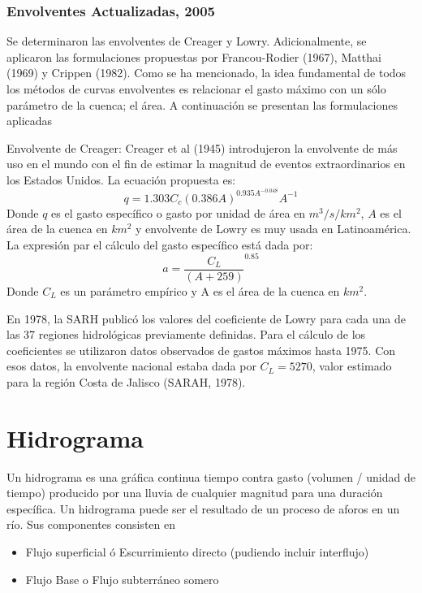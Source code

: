 \subsubsection{Envolventes Actualizadas, 2005}
Se determinaron las envolventes de Creager y Lowry. Adicionalmente, se aplicaron las formulaciones propuestas por Francou-Rodier (1967), Matthai (1969) y Crippen (1982).
Como se ha mencionado, la idea fundamental de todos los métodos de curvas envolventes es relacionar el gasto máximo con un sólo parámetro de la cuenca; el área. A continuación se presentan las formulaciones aplicadas

Envolvente de Creager: Creager et al (1945) introdujeron la envolvente de más uso en el mundo con el fin de estimar la magnitud de eventos extraordinarios en los Estados Unidos. La ecuación propuesta es:
\begin{equation}
    q = 1.303C_c\left(0.386A\right)^{0.935A^{ -0.048}}A^{ -1}
\end{equation}
Donde $q$ es el gasto específico o gasto por unidad de área en $m^{3}/s/km^2$, $A$ es el área de la cuenca en $km^2$ y envolvente de Lowry es muy usada en Latinoamérica. La expresión par el cálculo del gasto específico está dada por:
\begin{equation}
    a =\frac{C_L}{\left(A + 259\right)}^{0.85}
\end{equation}
Donde $C_L$ es un parámetro empírico y A es el área de la cuenca en $km^2$.

En 1978, la SARH publicó los valores del coeficiente de Lowry para cada una de las 37 regiones hidrológicas previamente definidas. Para el cálculo de los coeficientes se utilizaron datos observados de gastos máximos hasta 1975. Con esos datos, la envolvente nacional estaba dada por $C_L=5270$, valor estimado para la región Costa de Jalisco (SARAH, 1978).

\section{Hidrograma}
Un hidrograma es una gráfica continua tiempo contra gasto
(volumen / unidad de tiempo) producido por una lluvia de
cualquier magnitud para una duración específica. Un
hidrograma puede ser el resultado de un proceso de aforos
en un río.
Sus componentes consisten en \begin{itemize}
  \item  Flujo superficial ó Escurrimiento directo (pudiendo incluir interflujo)
  \item Flujo Base o Flujo subterráneo somero
\end{itemize}
